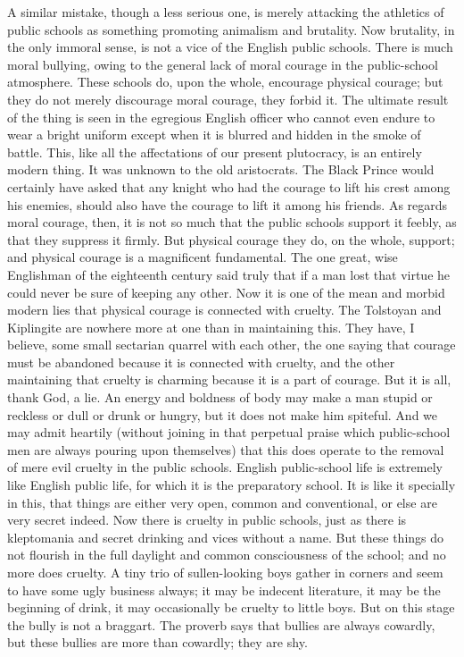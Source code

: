 \documentclass{book}
\begin{document}
A similar mistake, though a less serious one, is merely attacking the athletics of public schools as something promoting animalism and brutality. Now brutality, in the only immoral sense, is not a vice of the English public schools. There is much moral bullying, owing to the general lack of moral courage in the public-school atmosphere. These schools do, upon the whole, encourage physical courage; but they do not merely discourage moral courage, they forbid it. The ultimate result of the thing is seen in the egregious English officer who cannot even endure to wear a bright uniform except when it is blurred and hidden in the smoke of battle. This, like all the affectations of our present plutocracy, is an entirely modern thing. It was unknown to the old aristocrats. The Black Prince would certainly have asked that any knight who had the courage to lift his crest among his enemies, should also have the courage to lift it among his friends. As regards moral courage, then, it is not so much that the public schools support it feebly, as that they suppress it firmly. But physical courage they do, on the whole, support; and physical courage is a magnificent fundamental. The one great, wise Englishman of the eighteenth century said truly that if a man lost that virtue he could never be sure of keeping any other. Now it is one of the mean and morbid modern lies that physical courage is connected with cruelty. The Tolstoyan and Kiplingite are nowhere more at one than in maintaining this. They have, I believe, some small sectarian quarrel with each other, the one saying that courage must be abandoned because it is connected with cruelty, and the other maintaining that cruelty is charming because it is a part of courage. But it is all, thank God, a lie. An energy and boldness of body may make a man stupid or reckless or dull or drunk or hungry, but it does not make him spiteful. And we may admit heartily (without joining in that perpetual praise which public-school men are always pouring upon themselves) that this does operate to the removal of mere evil cruelty in the public schools. English public-school life is extremely like English public life, for which it is the preparatory school. It is like it specially in this, that things are either very open, common and conventional, or else are very secret indeed. Now there is cruelty in public schools, just as there is kleptomania and secret drinking and vices without a name. But these things do not flourish in the full daylight and common consciousness of the school; and no more does cruelty. A tiny trio of sullen-looking boys gather in corners and seem to have some ugly business always; it may be indecent literature, it may be the beginning of drink, it may occasionally be cruelty to little boys. But on this stage the bully is not a braggart. The proverb says that bullies are always cowardly, but these bullies are more than cowardly; they are shy.
\end{document}
